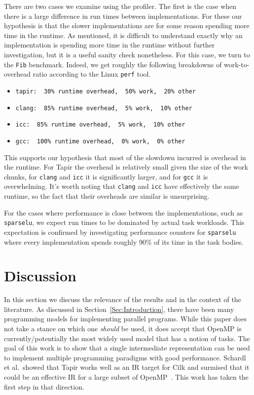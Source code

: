 \documentclass[sigconf]{acmart}
\begin{document}
There are two cases we examine using the profiler. The first is the
case when there is a large difference in run times between implementations. For 
these our hypothesis is that the slower implementations
are for some reason spending more time in the runtime. As mentioned, 
it is difficult to understand exactly why an implementation is spending more 
time in the runtime without further investigation, but it is a useful 
sanity check nonetheless. For this case, we turn to the \texttt{Fib} benchmark.
Indeed, we get roughly the following breakdowns of work-to-overhead ratio
according to the Linux \texttt{perf} tool.
\begin{itemize}
\item \texttt{tapir: ~30\% runtime overhead, ~50\% work, ~20\% other}
\item \texttt{clang: ~85\% runtime overhead, ~5\% work, ~10\% other}
\item \texttt{icc: ~85\% runtime overhead, ~5\% work, ~10\% other}
\item \texttt{gcc: ~100\% runtime overhead, ~0\% work, ~0\% other}
\end{itemize}
This supports our hypothesis that most of the slowdown incurred is overhead in
the runtime. For Tapir the overhead is relatively small given the size of the
work chunks, for \texttt{clang} and \texttt{icc} it is significantly larger,
and for \texttt{gcc} it is overwhelming. It's worth noting that \texttt{clang} 
and \texttt{icc} have effectively the same runtime, so the fact that their 
overheads are similar is unsurprising. 

For the cases where performance is close between the implementations, such as
\texttt{sparselu}, we expect run times to be dominated by actual task workloads. This 
expectation is confirmed by investigating performance counters for \texttt{sparselu}
where every implementation spends roughly 90\% of its time in the task
bodies. 

\section{Discussion} \label{Sec:Discussion}

In this section we discuss the relevance of the results and in the context of the
literature. As discussed in Section~\ref{Sec:Introduction}, 
there have been many programming models for implementing parallel programs. While
this paper does not take a stance on which one \emph{should} be used, it does
accept that OpenMP is currently/potentially the most widely used model that has 
a notion of tasks. The goal of this work is to show that a single intermediate
representation can be used to implement multiple programming paradigms with
good performance. Schardl et al.\ showed that Tapir works well as an IR target
for Cilk and surmised that it could be an effective IR for a large subset of
  OpenMP~\cite{tapir}. This work has taken the first step in that direction.
\end{document}
